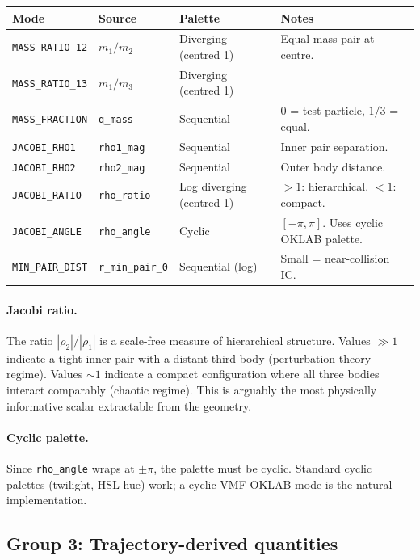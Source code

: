 \documentclass[11pt]{report}
\begin{document}
\begin{center}
\begin{tabular}{llll}
\toprule
Mode & Source & Palette & Notes \\
\midrule
\texttt{MASS\_RATIO\_12} & $m_1/m_2$ & Diverging (centred 1) & Equal mass pair at centre. \\
\texttt{MASS\_RATIO\_13} & $m_1/m_3$ & Diverging (centred 1) & \\
\texttt{MASS\_FRACTION} & \texttt{q\_mass} & Sequential & 0 = test particle, $1/3$ = equal. \\
\texttt{JACOBI\_RHO1} & \texttt{rho1\_mag} & Sequential & Inner pair separation. \\
\texttt{JACOBI\_RHO2} & \texttt{rho2\_mag} & Sequential & Outer body distance. \\
\texttt{JACOBI\_RATIO} & \texttt{rho\_ratio} & Log diverging (centred 1) & $>1$: hierarchical. $<1$: compact. \\
\texttt{JACOBI\_ANGLE} & \texttt{rho\_angle} & Cyclic & $[-\pi,\pi]$. Uses cyclic OKLAB palette. \\
\texttt{MIN\_PAIR\_DIST} & \texttt{r\_min\_pair\_0} & Sequential (log) & Small = near-collision IC. \\
\bottomrule
\end{tabular}
\end{center}

\paragraph{Jacobi ratio.} The ratio $|\rho_2|/|\rho_1|$ is a scale-free measure of hierarchical structure. Values $\gg 1$ indicate a tight inner pair with a distant third body (perturbation theory regime). Values $\sim 1$ indicate a compact configuration where all three bodies interact comparably (chaotic regime). This is arguably the most physically informative scalar extractable from the geometry.

\paragraph{Cyclic palette.} Since \texttt{rho\_angle} wraps at $\pm\pi$, the palette must be cyclic. Standard cyclic palettes (twilight, HSL hue) work; a cyclic VMF-OKLAB mode is the natural implementation.

\subsection{Group 3: Trajectory-derived quantities}
\end{document}
